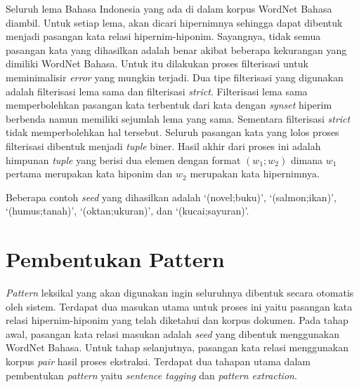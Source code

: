 Seluruh lema Bahasa Indonesia yang ada di dalam korpus WordNet Bahasa diambil. Untuk setiap lema, akan dicari hipernimnya sehingga dapat dibentuk menjadi pasangan kata relasi hipernim-hiponim. Sayangnya, tidak semua pasangan kata yang dihasilkan adalah benar akibat beberapa kekurangan yang dimiliki WordNet Bahasa. Untuk itu dilakukan proses filterisasi untuk meminimalisir \textit{error} yang mungkin terjadi. Dua tipe filterisasi yang digunakan adalah filterisasi lema sama dan filterisasi \textit{strict}. Filterisasi lema sama memperbolehkan pasangan kata terbentuk dari kata dengan \textit{synset} hiperim berbenda namun memiliki sejumlah lema yang sama. Sementara filterisasi \textit{strict} tidak memperbolehkan hal tersebut. Seluruh pasangan kata yang lolos proses filterisasi dibentuk menjadi \textit{tuple} biner. Hasil akhir dari proses ini adalah himpunan \textit{tuple} yang berisi dua elemen dengan format $(w_1;w_2)$ dimana $w_1$ pertama merupakan kata hiponim dan $w_2$ merupakan kata hipernimnya.

Beberapa contoh \textit{seed} yang dihasilkan adalah `(novel;buku)', `(salmon;ikan)', `(humus;tanah)', `(oktan;ukuran)', dan `(kucai;sayuran)'.


\section{Pembentukan Pattern}
\textit{Pattern} leksikal yang akan digunakan ingin seluruhnya dibentuk secara otomatis oleh sistem. Terdapat dua masukan utama untuk proses ini yaitu pasangan kata relasi hipernim-hiponim yang telah diketahui dan korpus dokumen. Pada tahap awal, pasangan kata relasi masukan adalah \textit{seed} yang dibentuk menggunakan WordNet Bahasa. Untuk tahap selanjutnya, pasangan kata relasi menggunakan korpus \textit{pair} hasil proses ekstraksi. Terdapat dua tahapan utama dalam pembentukan \textit{pattern} yaitu \textit{sentence tagging} dan \textit{pattern extraction}.

